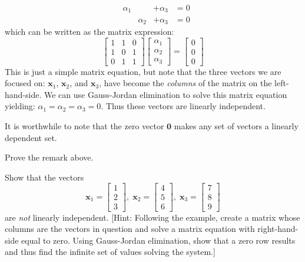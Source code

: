 \begin{example}
\begin{displaymath}
\begin{aligned}
&\alpha_1   &&+\alpha_3 &= 0 \\
&&\alpha_2  &+\alpha_3  &= 0
\end{aligned}
\end{displaymath}
which can be written as the matrix expression:
\begin{displaymath}
\begin{bmatrix}
1 & 1 & 0\\
1 & 0 & 1\\
0 & 1 & 1
\end{bmatrix}
\begin{bmatrix}
\alpha_1\\
\alpha_2\\
\alpha_3
\end{bmatrix}=
\begin{bmatrix}
0\\
0\\
0
\end{bmatrix}
\end{displaymath}
This is just a simple matrix equation, but note that the three vectors we are focused on: $\mathbf{x}_1$, $\mathbf{x}_2$, and $\mathbf{x}_3$, have become the \textit{columns} of the matrix on the left-hand-side. We can use Gauss-Jordan elimination to solve this matrix equation yielding: $\alpha_1 = \alpha_2 = \alpha_3 = 0$. Thus these vectors are linearly independent.
\label{ex:LinIndep1}
\end{example}

\begin{remark} It is worthwhile to note that the zero vector $\mathbf{0}$ makes any set of vectors a linearly dependent set.
\end{remark}

\begin{exercise} Prove the remark above.
\end{exercise}

\begin{exercise} Show that the vectors 
\begin{displaymath}
\mathbf{x}_1 = \begin{bmatrix}
1\\2\\3
\end{bmatrix},\;
\mathbf{x}_2 = \begin{bmatrix}
4\\5\\6
\end{bmatrix},\;
\mathbf{x}_3 = \begin{bmatrix}
7\\8\\9
\end{bmatrix}
\end{displaymath}
are \textit{not} linearly independent. [Hint: Following the example, create a matrix whose columns are the vectors in question and solve a matrix equation with right-hand-side equal to zero. Using Gauss-Jordan elimination, show that a zero row results and thus find the infinite set of values solving the system.]
\label{exer:NotLinIndep}
\end{exercise}

